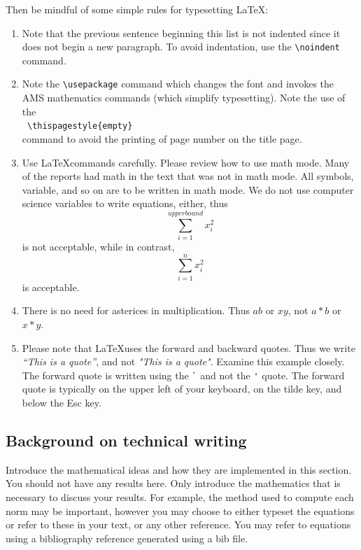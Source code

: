 \noindent
Then be mindful of some simple rules for typesetting \LaTeX:
\begin{enumerate}
\item
Note that the previous sentence beginning this list
is not indented since it does
not begin a new paragraph. To avoid indentation,
use the \verb+\noindent+
command.

\item
Note the \verb+\usepackage+  command which changes the font and invokes
the AMS mathematics
commands (which simplify typesetting).
Note the use of the \\
\verb+ \thispagestyle{empty}+ \\
command to avoid the printing of 
page number on the title page.

\item
Use \LaTeX commands carefully. Please review how to use math mode.
Many of the reports had math in the text that was not in math
mode. All symbols, variable, and so on are to be written in math mode.
We do not use computer science variables to write equations, either,
thus
%
%
%
\begin{equation*}
\sum_{i=1}^{upperbound} x_i^2
\end{equation*}
%
%
%
is not acceptable, while in contrast,
%
%
%
\begin{equation*}
\sum_{i=1}^{n} x_i^2
\end{equation*}
%
%
%
is acceptable. 

\item
There is no need for asterices in multiplication. Thus $ab$ or $xy$,
not $a*b$ or $x*y$.


\item
Please note that \LaTeX uses the forward and backward quotes. Thus we write
\textit{``This is a quote''}, and not \textit{"This is a quote"}.
Examine this example closely. The forward quote is written using
the \verb+`+ and not the \verb+'+ quote. The forward quote is typically
on the upper left of your keyboard, on the tilde key, and below the
Esc key.
\end{enumerate}

\subsection{Background on technical writing}

Introduce the mathematical ideas and how they are implemented in this
section. You should not have any results here.
Only introduce the mathematics that is necessary to discuss your
results. For example, the method used to compute each norm may be
important, however you may choose to either typeset the equations
or refer to these in your text, or any other reference.
You may refer to equations using a
bibliography reference generated using a bib file.



